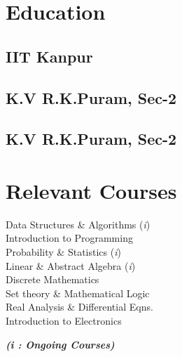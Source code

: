 \documentclass[]{deedy-resume-openfont}
\begin{document}
\begin{minipage}[t]{0.30\textwidth} 

\vspace{-0.5cm}
\section{Education} 

\subsection{IIT Kanpur}
\sectionsep{}

\subsection{K.V R.K.Puram, Sec-2}
\sectionsep{}

\subsection{K.V R.K.Puram, Sec-2}


\section{Relevant Courses}
Data Structures \& Algorithms (\textit{i}) \\
Introduction to Programming \\
Probability \& Statistics (\textit{i}) \\
Linear \& Abstract Algebra (\textit{i}) \\
Discrete Mathematics \\
Set theory \& Mathematical Logic \\
Real Analysis \& Differential Eqns. \\
Introduction to Electronics

{\footnotesize \textit{\textbf{ (i : Ongoing Courses)}}}



\end{minipage}
\end{document}
